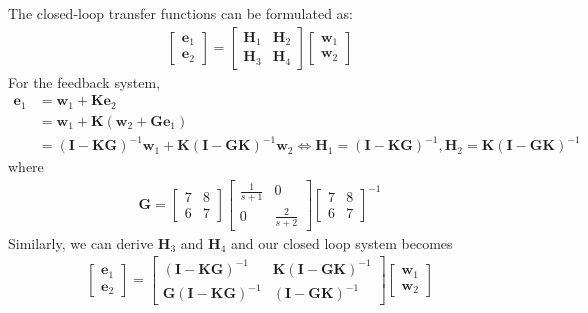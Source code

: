 The closed-loop transfer functions can be formulated as:
\begin{align*}
    \begin{bmatrix}
    \bm{e}_1 \\
    \bm{e}_2
    \end{bmatrix} =
    \begin{bmatrix}
    \bm{H}_1 & \bm{H}_2\\
    \bm{H}_3 & \bm{H}_4
    \end{bmatrix}
    \begin{bmatrix}
    \bm{w}_1 \\
    \bm{w}_2
    \end{bmatrix}
\end{align*}
For the feedback system, 
\begin{align*}
    \bm{e}_1 
    &= \bm{w}_1 + \bm{K}\bm{e}_2\\
    &= \bm{w}_1 + \bm{K}\left(\bm{w}_2 + \bm{G}\bm{e}_1\right)\\
    &= \left(\bm{I} - \bm{KG}\right)^{-1}\bm{w}_1 + \bm{K}\left(\bm{I} - \bm{GK}\right)^{-1}\bm{w}_2
    \Leftrightarrow \bm{H}_1 = \left(\bm{I} - \bm{KG}\right)^{-1}, 
    \bm{H}_2 = \bm{K}\left(\bm{I} - \bm{GK}\right)^{-1}
\end{align*}
where
\begin{align*}
    \bm{G} = 
    \begin{bmatrix}
        7&8\\
        6&7
    \end{bmatrix}
    \begin{bmatrix}
        \frac{1}{s+1}&0\\
        0&\frac{2}{s+2}
    \end{bmatrix}
    \begin{bmatrix}
        7&8\\
        6&7
    \end{bmatrix}^{-1}
\end{align*}
Similarly, we can derive $\bm{H}_3$ and $\bm{H}_4$ and our closed loop system becomes 
\begin{align*}
    \begin{bmatrix}
    \bm{e}_1 \\
    \bm{e}_2
    \end{bmatrix} =
    \begin{bmatrix}
    \left(\bm{I} - \bm{KG}\right)^{-1} & \bm{K}\left(\bm{I} - \bm{GK}\right)^{-1}\\
    \bm{G}\left(\bm{I} - \bm{KG}\right)^{-1} & \left(\bm{I} - \bm{GK}\right)^{-1}
    \end{bmatrix}
    \begin{bmatrix}
    \bm{w}_1 \\
    \bm{w}_2
    \end{bmatrix}
\end{align*}
